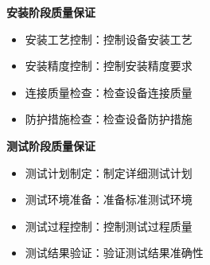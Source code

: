 \documentclass[UTF8,a4paper,12pt]{article}
\begin{document}
\textbf{安装阶段质量保证}
\begin{itemize}
    \item 安装工艺控制：控制设备安装工艺
    \item 安装精度控制：控制安装精度要求
    \item 连接质量检查：检查设备连接质量
    \item 防护措施检查：检查设备防护措施
\end{itemize}

\textbf{测试阶段质量保证}
\begin{itemize}
    \item 测试计划制定：制定详细测试计划
    \item 测试环境准备：准备标准测试环境
    \item 测试过程控制：控制测试过程质量
    \item 测试结果验证：验证测试结果准确性
\end{itemize}
\end{document}
